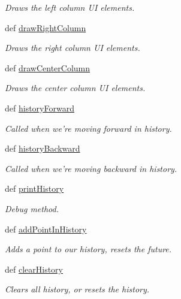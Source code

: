 \begin{DoxyCompactItemize}
\begin{DoxyCompactList}\small\item\em Draws the left column U\-I elements. \end{DoxyCompactList}\item 
def \hyperlink{classsimplegui_1_1_main_scene_adf07e31f3e330acfdf78ca1155e65fd0}{draw\-Right\-Column}
\begin{DoxyCompactList}\small\item\em Draws the right column U\-I elements. \end{DoxyCompactList}\item 
def \hyperlink{classsimplegui_1_1_main_scene_a17c05e23835e26489665463846367443}{draw\-Center\-Column}
\begin{DoxyCompactList}\small\item\em Draws the center column U\-I elements. \end{DoxyCompactList}\item 
def \hyperlink{classsimplegui_1_1_main_scene_a8b2f261a306a2919d702e57475f15589}{history\-Forward}
\begin{DoxyCompactList}\small\item\em Called when we're moving forward in history. \end{DoxyCompactList}\item 
def \hyperlink{classsimplegui_1_1_main_scene_ac745bb4c5e46e8abfb92619905ff9845}{history\-Backward}
\begin{DoxyCompactList}\small\item\em Called when we're moving backward in history. \end{DoxyCompactList}\item 
def \hyperlink{classsimplegui_1_1_main_scene_a85395ee516211bc07cdd7ff765158de0}{print\-History}
\begin{DoxyCompactList}\small\item\em Debug method. \end{DoxyCompactList}\item 
def \hyperlink{classsimplegui_1_1_main_scene_a8c7e504663d3819336e4df829e9819cf}{add\-Point\-In\-History}
\begin{DoxyCompactList}\small\item\em Adds a point to our history, resets the future. \end{DoxyCompactList}\item 
def \hyperlink{classsimplegui_1_1_main_scene_a2e495c8b6cf4da78947791e42dcd8f42}{clear\-History}
\begin{DoxyCompactList}\small\item\em Clears all history, or resets the history. \end{DoxyCompactList}\item 

\end{DoxyCompactItemize}
